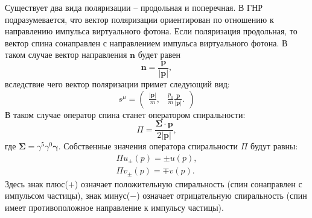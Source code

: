\documentclass{extarticle}
\begin{document}
Существует два вида поляризации -- продольная и поперечная. В ГНР подразумевается, что вектор поляризации ориентирован по отношению к направлению импульса виртуального фотона. Если поляризация продольная, то вектор спина сонаправлен с направлением импульса виртуального фотона. В таком случае вектор направления $\boldsymbol{n}$ будет равен
\begin{equation}
	\boldsymbol{n} = \frac{\boldsymbol{p}}{|\boldsymbol{p}|},
\end{equation}
вследствие чего вектор поляризации примет следующий вид:
\begin{equation}
	s^\mu = \begin{pmatrix}
		\frac{|\boldsymbol{p}|}{m}, & \frac{p_0}{m} \frac{\boldsymbol{p}}{|\boldsymbol{p}|}.
	\end{pmatrix}
\end{equation}
В таком случае оператор спина станет оператором спиральности:
\begin{equation}
	\Pi = \frac{\boldsymbol{\Sigma} \cdot \boldsymbol{p}}{2 |\boldsymbol{p}|},
\end{equation}
где $\boldsymbol{\Sigma} = \gamma^5 \gamma^0 \boldsymbol{\gamma}$. Собственные значения оператора спиральности $\Pi$ будут равны:
\begin{equation}
	\begin{split}
		\Pi u_{\pm}(p) = \pm u(p), \\
		\Pi v_{\pm}(p) = \mp v(p).
	\end{split}	
\end{equation}
Здесь знак плюс($+$) означает положительную спиральность (спин сонаправлен с импульсом частицы), знак минус($-$) означает отрицательную спиральность (спин имеет противоположное направление к импульсу частицы). 
\end{document}
